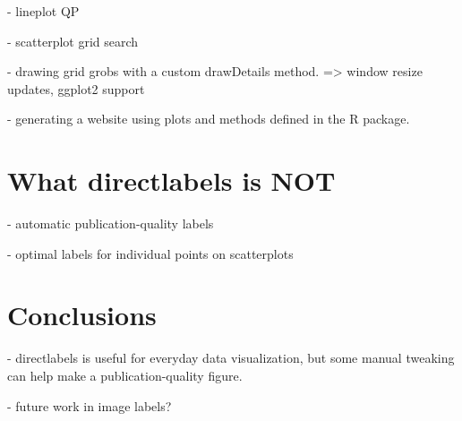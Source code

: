 \documentclass{beamer}
\begin{document}
- lineplot QP

- scatterplot grid search

- drawing grid grobs with a custom drawDetails method. => window
resize updates, ggplot2 support

- generating a website using plots and methods defined in the R
package.

\section{What directlabels is NOT}

- automatic publication-quality labels

- optimal labels for individual points on scatterplots

\section{Conclusions}

- directlabels is useful for everyday data visualization, but some
manual tweaking can help make a publication-quality figure.

- future work in image labels?
\end{document}
